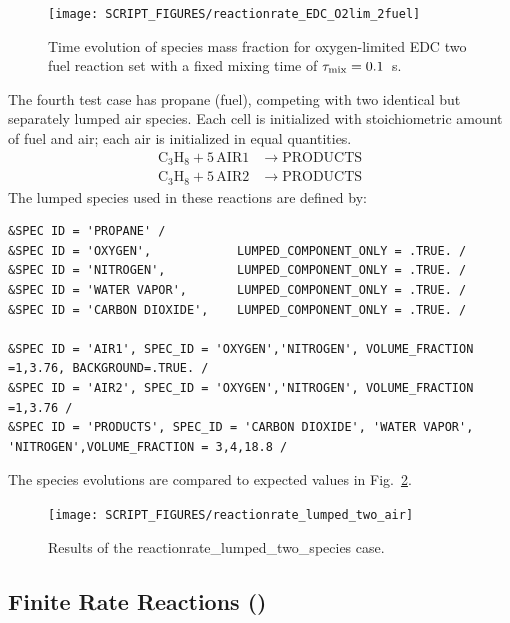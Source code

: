 \documentclass[11pt]{book}
\begin{document}
\begin{figure}[!ht]
\centering
\texttt{[image: SCRIPT\_FIGURES/reactionrate\_EDC\_O2lim\_2fuel]}
\caption[Species evolution in two parallel EDC reactions]{Time evolution of species mass fraction for oxygen-limited EDC two fuel reaction set with a fixed mixing time of $\tau_{\rm mix}=0.1$~s.}
\label{fig:EDC_2Step_ox}
\end{figure}

The fourth test case has propane (fuel), competing with two identical but separately lumped air species. Each cell is initialized with stoichiometric amount of fuel and air; each air is initialized in equal quantities.
\begin{align}\label{eq:lumped_2_air}
\mathrm{C_3H_8 + 5 \, AIR1} &\rightarrow  \mathrm{PRODUCTS} \\
\nonumber \mathrm{C_3H_8 + 5 \, AIR2} &\rightarrow \mathrm{PRODUCTS}
\end{align}
The lumped species used in these reactions are defined by:
\begin{lstlisting}
&SPEC ID = 'PROPANE' /
&SPEC ID = 'OXYGEN',            LUMPED_COMPONENT_ONLY = .TRUE. /
&SPEC ID = 'NITROGEN',          LUMPED_COMPONENT_ONLY = .TRUE. /
&SPEC ID = 'WATER VAPOR',       LUMPED_COMPONENT_ONLY = .TRUE. /
&SPEC ID = 'CARBON DIOXIDE',    LUMPED_COMPONENT_ONLY = .TRUE. /

&SPEC ID = 'AIR1', SPEC_ID = 'OXYGEN','NITROGEN', VOLUME_FRACTION =1,3.76, BACKGROUND=.TRUE. /
&SPEC ID = 'AIR2', SPEC_ID = 'OXYGEN','NITROGEN', VOLUME_FRACTION =1,3.76 /
&SPEC ID = 'PRODUCTS', SPEC_ID = 'CARBON DIOXIDE', 'WATER VAPOR', 'NITROGEN',VOLUME_FRACTION = 3,4,18.8 /
\end{lstlisting}
The species evolutions are compared to expected values in Fig.~\ref{fig:reactionrate_lumped_two_air}.
\begin{figure}[!ht]
\centering
\texttt{[image: SCRIPT\_FIGURES/reactionrate\_lumped\_two\_air]}
\caption[Results of the {\ct reactionrate\_lumped\_two\_species} case]{Results of the {\ct reactionrate\_lumped\_two\_species} case.}
\label{fig:reactionrate_lumped_two_air}
\end{figure}



\FloatBarrier

\subsection{Finite Rate Reactions (\texorpdfstring{}{reactionrate\_arrhenius})}
\label{finite_rate_reactions}
\label{reactionrate_arrhenius_equilibrium}
\label{reactionrate_arrhenius_0order_1step}
\label{reactionrate_arrhenius_2order_1step}
\label{reactionrate_arrhenius_1p75order_2step}
\label{reactionrate_arrhenius_1p75order_2stepr}
\end{document}
